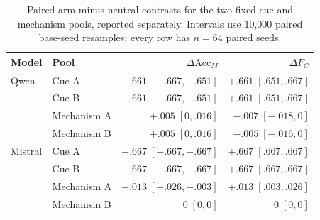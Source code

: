 
\begin{table}[t]
  \centering
  \small
  \setlength{\tabcolsep}{5pt}
  \begin{tabular}{llrr}
    \toprule
    Model & Pool & $\Delta\mathrm{Acc}_M$ & $\Delta F_C$ \\
    \midrule
    Qwen & Cue A & $-.661\;[-.667,-.651]$ & $+.661\;[.651,.667]$ \\
     & Cue B & $-.661\;[-.667,-.651]$ & $+.661\;[.651,.667]$ \\
     & Mechanism A & $+.005\;[0,.016]$ & $-.007\;[-.018,0]$ \\
     & Mechanism B & $+.005\;[0,.016]$ & $-.005\;[-.016,0]$ \\
    \midrule
    Mistral & Cue A & $-.667\;[-.667,-.667]$ & $+.667\;[.667,.667]$ \\
     & Cue B & $-.667\;[-.667,-.667]$ & $+.667\;[.667,.667]$ \\
     & Mechanism A & $-.013\;[-.026,-.003]$ & $+.013\;[.003,.026]$ \\
     & Mechanism B & $0\;[0,0]$ & $0\;[0,0]$ \\
    \bottomrule
  \end{tabular}
  \caption{Paired arm-minus-neutral contrasts for the two fixed cue and mechanism
  pools, reported separately. Intervals use 10,000 paired base-seed resamples;
  every row has $n=64$ paired seeds.}
  \label{tab:confirmatory-contrasts}
\end{table}
